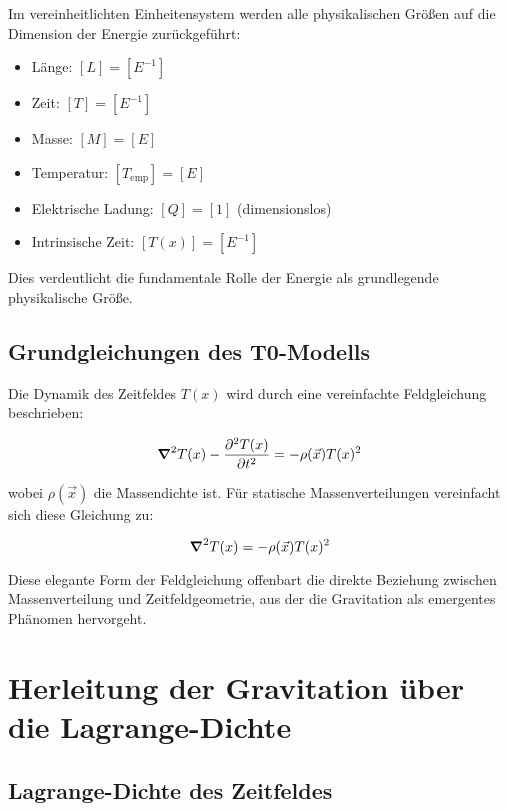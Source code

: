 \documentclass[12pt,a4paper]{article}
\newcommand{\Tfield}{T(x)}
\newcommand{\vecx}{\vec{x}}
\begin{document}
	Im vereinheitlichten Einheitensystem werden alle physikalischen Größen auf die Dimension der Energie zurückgeführt:
	
	\begin{itemize}
		\item Länge: $[L] = [E^{-1}]$
		\item Zeit: $[T] = [E^{-1}]$
		\item Masse: $[M] = [E]$
		\item Temperatur: $[T_{\text{emp}}] = [E]$
		\item Elektrische Ladung: $[Q] = [1]$ (dimensionslos)
		\item Intrinsische Zeit: $[\Tfield] = [E^{-1}]$
	\end{itemize}
	
	Dies verdeutlicht die fundamentale Rolle der Energie als grundlegende physikalische Größe.
	
	\subsection{Grundgleichungen des T0-Modells}
	
	Die Dynamik des Zeitfeldes \(\Tfield\) wird durch eine vereinfachte Feldgleichung beschrieben:
	
	\begin{equation}
		\grad^2 \Tfield - \frac{\partial^2 \Tfield}{\partial t^2} = -\rho(\vecx) \Tfield^2
	\end{equation}
	
	wobei \(\rho(\vecx)\) die Massendichte ist. Für statische Massenverteilungen vereinfacht sich diese Gleichung zu:
	
	\begin{equation}
		\grad^2 \Tfield = -\rho(\vecx) \Tfield^2
	\end{equation}
	
	Diese elegante Form der Feldgleichung offenbart die direkte Beziehung zwischen Massenverteilung und Zeitfeldgeometrie, aus der die Gravitation als emergentes Phänomen hervorgeht.
	
	\section{Herleitung der Gravitation über die Lagrange-Dichte}
	
	\subsection{Lagrange-Dichte des Zeitfeldes}
	
\end{document}
